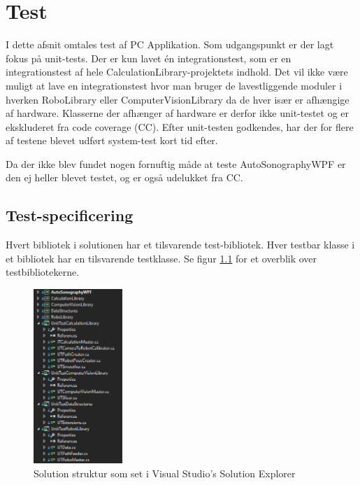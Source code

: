 \chapter{Test}\label{Test}
I dette afsnit omtales test af PC Applikation. Som udgangspunkt er der lagt fokus på unit-tests. Der er kun lavet én integrationstest, som er en integrationstest af hele CalculationLibrary-projektets indhold. Det vil ikke være muligt at lave en integrationstest hvor man bruger de lavestliggende moduler i hverken RoboLibrary eller ComputerVisionLibrary da de hver især er afhængige af hardware. Klasserne der afhænger af hardware er derfor ikke unit-testet og er ekskluderet fra code coverage (CC). 
Efter unit-testen godkendes, har der for flere af testene blevet udført system-test kort tid efter.

Da der ikke blev fundet nogen fornuftig måde at teste AutoSonographyWPF er den ej heller blevet testet, og er også udelukket fra CC.
\section{Test-specificering}
Hvert bibliotek i solutionen har et tilsvarende test-bibliotek. Hver testbar klasse i et bibliotek har en tilsvarende testklasse. Se figur \ref{SolutionStructure} for et overblik over testbibliotekerne.

\begin{figure}[H]
    \centering
    \includegraphics[width=0.3\textwidth]{figurer/d/Test/solution_overview}
    \caption{Solution struktur som set i Visual Studio's Solution Explorer}
    \label{SolutionStructure}
\end{figure}

\newpage
